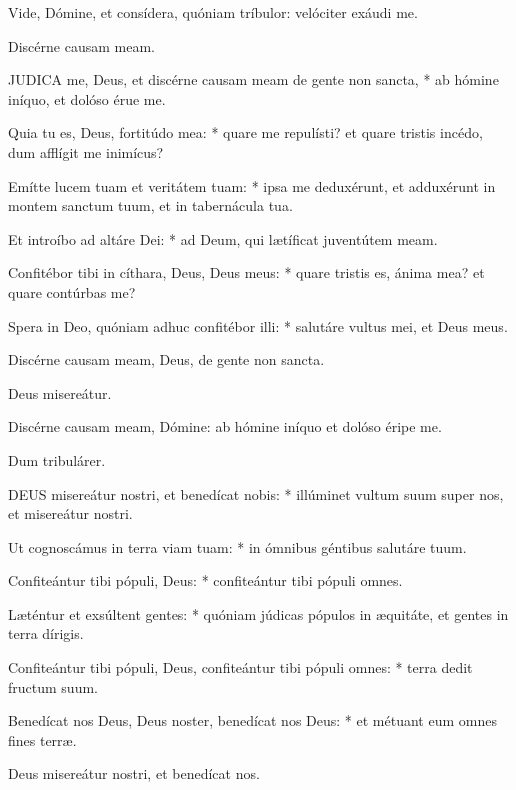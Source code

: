 
 Vide, Dómine, et consídera, quóniam tríbulor: velóciter exáudi me.

 Discérne causam meam.


\lettrine[lines=2]{J}{UDICA} me, Deus, et discérne causam meam de gente non sancta, * ab hómine iníquo, et dolóso érue me.

Quia tu es, Deus, fortitúdo mea: * quare me repulísti? et quare tristis incédo, dum afflígit me inimícus?

Emítte lucem tuam et veritátem tuam: * ipsa me deduxérunt, et adduxérunt in montem sanctum tuum, et in tabernácula tua.

Et introíbo ad altáre Dei: * ad Deum, qui lætíficat juventútem meam.

Confitébor tibi in cíthara, Deus, Deus meus: * quare tristis es, ánima mea? et quare contúrbas me?

Spera in Deo, quóniam adhuc confitébor illi: * salutáre vultus mei, et Deus meus.

 Discérne causam meam, Deus, de gente non sancta.

 Deus misereátur. \textdagger


 Discérne causam meam, Dómine: ab hómine iníquo et dolóso éripe me.

 Dum tribulárer.


\lettrine[lines=2]{D}{EUS} misereátur nostri, et benedícat nobis: * illúminet vultum suum super nos, et misereátur nostri.

Ut cognoscámus in terra viam tuam: * in ómnibus géntibus salutáre tuum.

Confiteántur tibi pópuli, Deus: * confiteántur tibi pópuli omnes.

Læténtur et exsúltent gentes: * quóniam júdicas pópulos in æquitáte, et gentes in terra dírigis.

Confiteántur tibi pópuli, Deus, confiteántur tibi pópuli omnes: * terra dedit fructum suum.

Benedícat nos Deus, Deus noster, benedícat nos Deus: * et métuant eum omnes fines terræ.

 Deus misereátur nostri, et benedícat nos.

